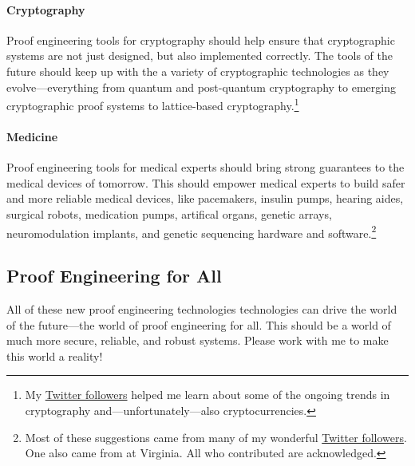 \paragraph{Cryptography}
Proof engineering tools for cryptography should help ensure that cryptographic systems are not just designed, but also implemented correctly.
The tools of the future should keep up with the a variety of cryptographic technologies as they evolve---everything from quantum and post-quantum cryptography
to emerging cryptographic proof systems to lattice-based cryptography.\footnote{My \href{https://twitter.com/TaliaRinger/status/1391943048465055750}{Twitter followers}
helped me learn about some of the ongoing trends in cryptography and---unfortunately---also cryptocurrencies.} 

\paragraph{Medicine} 
Proof engineering tools for medical experts should bring strong guarantees to the medical devices of tomorrow.
This should empower medical experts to build safer and more reliable medical devices,
like pacemakers, insulin pumps, hearing aides, surgical robots, medication pumps, artifical organs,
genetic arrays, neuromodulation implants, and genetic sequencing hardware and 
software.\footnote{Most of these suggestions came from many of my wonderful \href{https://twitter.com/TaliaRinger/status/1388282607926857731}{Twitter followers}.
One also came from  at Virginia. All who contributed are acknowledged.}


\subsection*{Proof Engineering for All}

All of these new proof engineering technologies technologies can drive the world of the future---the world of proof engineering for all.
This should be a world of much more secure, reliable, and robust systems.
Please work with me to make this world a reality!

